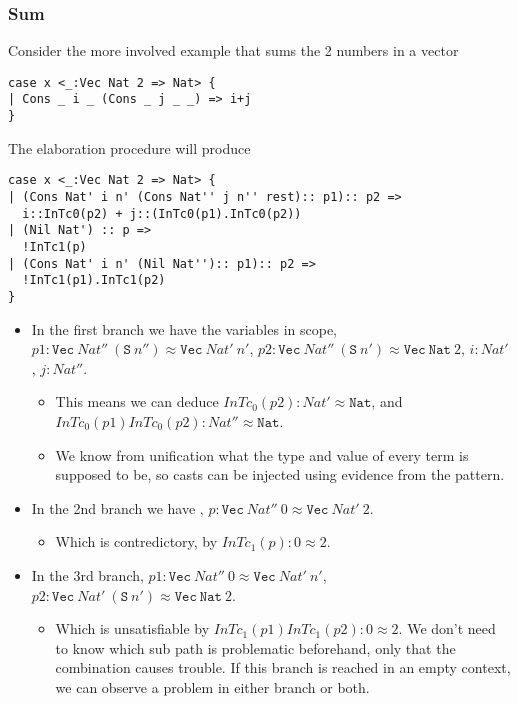 \subsubsection{Sum}

Consider the more involved example that sums the 2 numbers in a vector

\begin{lstlisting}[basicstyle={\ttfamily\small}]
case x <_:Vec Nat 2 => Nat> {
| Cons _ i _ (Cons _ j _ _) => i+j
}
\end{lstlisting}

The elaboration procedure will produce

\begin{lstlisting}[basicstyle={\ttfamily\small}]
case x <_:Vec Nat 2 => Nat> {
| (Cons Nat' i n' (Cons Nat'' j n'' rest):: p1):: p2 => 
  i::InTc0(p2) + j::(InTc0(p1).InTc0(p2))
| (Nil Nat') :: p => 
  !InTc1(p)
| (Cons Nat' i n' (Nil Nat''):: p1):: p2 =>
  !InTc1(p1).InTc1(p2) 
}
\end{lstlisting}

\begin{itemize}
\item
In the first branch we have the variables in scope, $p1:\mathtt{Vec}\ Nat''\ (\mathtt{S}\ n'')\approx\mathtt{Vec}\ Nat'\ n'$, $p2:\mathtt{Vec}\ Nat''\ (\mathtt{S}\ n')\approx\mathtt{Vec}\ \mathtt{Nat}\ 2$, $i:Nat'$, $j:Nat''$.
\begin{itemize}
\item 
This means we can deduce $InTc_{0}(p2):Nat'\approx\mathtt{Nat}$, and $InTc_{0}(p1)InTc_{0}(p2):Nat''\approx\mathtt{Nat}$.
\item 
We know from unification what the type and value of every term is supposed to be, so casts can be injected using evidence from the pattern.
\end{itemize}
\item 
In the 2nd branch we have , $p:\mathtt{Vec}\ Nat''\ 0\approx\mathtt{Vec}\ Nat'\ 2$.
\begin{itemize}
\item 
Which is contredictory, by $InTc_{1}(p):0\approx2$.
\end{itemize}
\item 
In the 3rd branch, $p1:\mathtt{Vec}\ Nat''\ 0\approx\mathtt{Vec}\ Nat'\ n'$, $p2:\mathtt{Vec}\ Nat'\ (\mathtt{S}\ n')\approx\mathtt{Vec}\ \mathtt{Nat}\ 2$. 
\begin{itemize}
\item
Which is unsatisfiable by $InTc_{1}(p1)InTc_{1}(p2):0\approx2$.
We don't need to know which sub path is problematic beforehand, only that the combination causes trouble.
If this branch is reached in an empty context, we can observe a problem in either branch or both.
\end{itemize}
\end{itemize}

